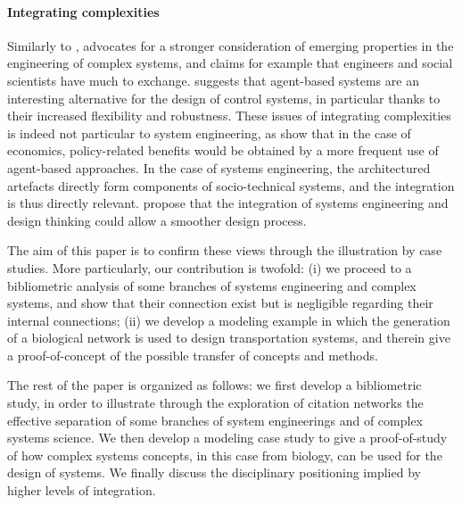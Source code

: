 \documentclass[alpha-refs]{wiley-article}
\begin{document}
\paragraph{Integrating complexities}


Similarly to \cite{sheard2009principles}, \cite{ottino2004engineering} advocates for a stronger consideration of emerging properties in the engineering of complex systems, and claims for example that engineers and social scientists have much to exchange. \cite{jennings2003agent} suggests that agent-based systems are an interesting alternative for the design of control systems, in particular thanks to their increased flexibility and robustness. These issues of integrating complexities is indeed not particular to system engineering, as \cite{farmer2009economy} show that in the case of economics, policy-related benefits would be obtained by a more frequent use of agent-based approaches. In the case of systems engineering, the architectured artefacts directly form components of socio-technical systems, and the integration is thus directly relevant. \cite{durantin2017disruptive} propose that the integration of systems engineering and design thinking could allow a smoother design process.

The aim of this paper is to confirm these views through the illustration by case studies. More particularly, our contribution is twofold: (i) we proceed to a bibliometric analysis of some branches of systems engineering and complex systems, and show that their connection exist but is negligible regarding their internal connections; (ii) we develop a modeling example in which the generation of a biological network is used to design transportation systems, and therein give a proof-of-concept of the possible transfer of concepts and methods.


The rest of the paper is organized as follows: we first develop a bibliometric study, in order to illustrate through the exploration of citation networks the effective separation of some branches of system engineerings and of complex systems science. We then develop a modeling case study to give a proof-of-study of how complex systems concepts, in this case from biology, can be used for the design of systems. We finally discuss the disciplinary positioning implied by higher levels of integration.
\end{document}
